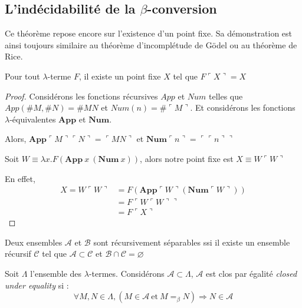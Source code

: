 \subsection{L'indécidabilité de la $\beta$-conversion} %
Ce théorème repose encore sur l'existence d'un point fixe. 
Sa démonstration est ainsi toujours similaire au théorème d'incomplétude de Gödel ou au 
théorème de Rice.
\begin{theoreme}
	Pour tout $\lambda$-terme $F$, il existe un point fixe $X$ tel que 
	$F \ulcorner X \urcorner = X $ 
\end{theoreme}
\begin{proof}
Considérons les fonctions récursives $App$ et $Num$ telles que $App(\#M, \#N)=\#MN$	
et $Num(n)=\#\ulcorner M \urcorner $. Et considérons les fonctions $\lambda$-équivalentes 
$\mathbf{App}$ et $\mathbf{Num}$.

Alors, $\mathbf{App}\ulcorner M \urcorner \ulcorner N \urcorner = \ulcorner MN \urcorner$ et 
$\mathbf{Num}\ulcorner n \urcorner = \ulcorner \ulcorner n \urcorner \urcorner$

Soit $W \equiv \lambda x.F(\mathbf{App}\ x \ (\mathbf{Num}\ x))$, alors notre point fixe est
 $X\equiv W \ulcorner W \urcorner$

En effet,
\begin{align*}
 X=W\ulcorner W \urcorner &= F(\mathbf{App}\ulcorner W \urcorner (\mathbf{Num}\ulcorner W \urcorner)) \\
			  &= F \ulcorner W \ulcorner W \urcorner \urcorner \\
			  &= F \ulcorner X \urcorner
\end{align*}

\end{proof}

\begin{definition}
Deux ensembles $\mathcal{A}$ et $\mathcal{B}$ sont récursivement séparables ssi il existe un 
ensemble récursif $\mathcal{C}$	tel que $\mathcal{A} \subset \mathcal{C}$ et 
$\mathcal{B} \cap \mathcal{C} = \varnothing $
\end{definition}

\begin{definition}
	Soit $\Lambda$ l'ensemble des $\lambda$-termes. Considérons $\mathcal{A} \subset  \Lambda$, 
	$\mathcal{A}$ est clos par égalité \textit{closed under equality} si :
	$$ \forall M, N \in \Lambda, (M \in \mathcal{A}  \ \text{et}\  M=_{\beta}N) \Rightarrow 
	                              N \in \mathcal{A}$$ 
\end{definition}

